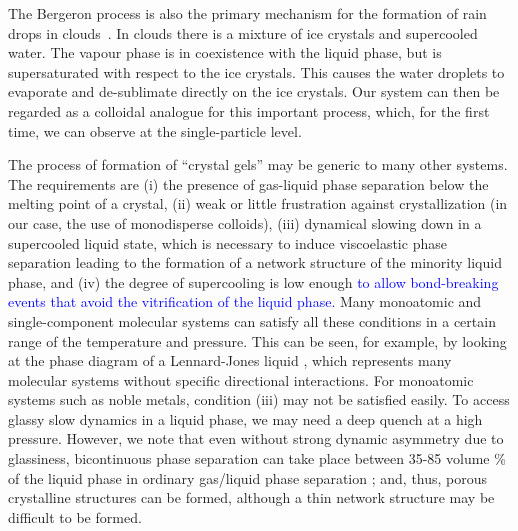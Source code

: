 \documentclass[preprint,amsmath,amssymb,superscriptaddress]{revtex4-1}
\begin{document}
The Bergeron process is also the primary mechanism for the formation of rain drops in clouds~\cite{glickman2000glossary,morrison2012resilience}.
In clouds there is a mixture of ice crystals and supercooled water. The vapour phase is in coexistence with the liquid phase, but is supersaturated
with respect to the ice crystals. This causes the water droplets to evaporate and de-sublimate directly on the ice crystals. Our system can then
be regarded as a colloidal analogue for this important process, which, for the first time, we can observe at the single-particle level.  

The process of formation of ``crystal gels'' may be generic to many other 
systems. The requirements are (i) the presence of gas-liquid phase separation below the melting point of a crystal, (ii) 
weak or little frustration against crystallization (in our case, the use of monodisperse colloids), 
(iii) dynamical slowing down in a supercooled liquid state, which is necessary to induce viscoelastic phase separation leading to the formation 
of a network structure of the minority liquid phase, and (iv) the degree of supercooling is low enough
\textcolor{blue}{to allow bond-breaking events that avoid the vitrification of the liquid phase.}
Many monoatomic and single-component molecular systems can satisfy all these conditions in a certain range of the temperature and pressure. 
This can be seen, for example, by looking at the phase diagram of a Lennard-Jones liquid \cite{lodge1997brownian}, which represents many molecular systems 
without specific directional interactions. For monoatomic systems such as noble metals, condition (iii) may not be satisfied easily. 
To access glassy slow dynamics in a liquid phase, we may need a deep quench at a high pressure. However, we note that even without strong dynamic asymmetry 
due to glassiness, bicontinuous phase separation can take place between 35-85 volume \% of the liquid phase in ordinary gas/liquid phase separation \cite{Onuki2002}; 
and, thus, porous crystalline structures can be formed, although a thin network structure may be difficult to be formed.
\end{document}
